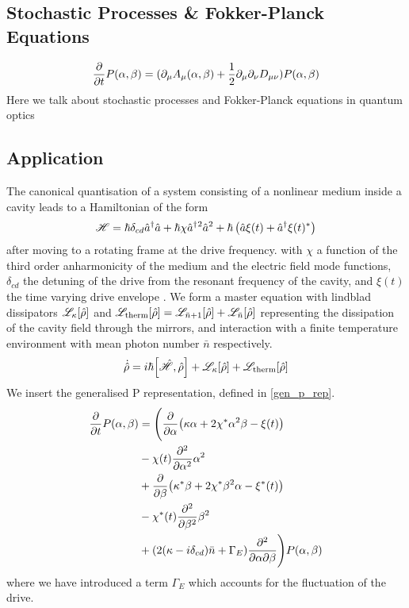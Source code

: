 \subsection{Stochastic Processes \& Fokker-Planck Equations}
\begin{equation}
  \pdv{t}P(\alpha, \beta) = (\partial_\mu A_\mu (\alpha, \beta) + \frac{1}{2} \partial_\mu \partial_\nu D_{\mu\nu}) P(\alpha, \beta) 
  \label{fokker_planck}
\end{equation}
Here we talk about stochastic processes and Fokker-Planck equations in quantum optics 
 \cite{Carmichael1992} 
 \cite{Carmichael2008} 
 \cite{Breuer2002} 
\subsection{Application}
The canonical quantisation of a system consisting of a nonlinear medium inside a cavity leads to a Hamiltonian of the form 
\begin{equation}
  \mathscr{H} = \hbar \delta_{cd} {\hat{a}^\dagger} \hat{a} + \hbar \chi {\hat{a}^\dagger}{}^ 2 \hat{a}{}^ 2 + \hbar \left( \hat{a} \xi(t) + {\hat{a}^\dagger} \xi(t)^* \right) 
\end{equation}
after moving to a rotating frame at the drive frequency.
with $\chi$ a function of the third order anharmonicity of the medium and the electric field mode functions, $\delta_{cd}$ the detuning of the drive from the resonant frequency of the cavity, and $\xi(t)$ the time varying drive envelope \cite{Drummond1979}.
We form a master equation with lindblad dissipators $\mathscr{L}_{\kappa}[\hat{\rho}]$ and $\mathscr{L}_{\text{therm}}[\hat{\rho}] = \mathscr{L}_{\bar{n}+1}[\hat{\rho}] +  \mathscr{L}_{\bar{n}}[\hat{\rho}]$ representing the dissipation of the cavity field through the mirrors, and interaction with a finite temperature environment with mean photon number $\bar{n}$ respectively.
\begin{equation}
  \dot{\dens} = i\hbar\comm{\ham}{\dens} + \mathscr{L}_{\kappa}[\dens] + \mathscr{L}_{\text{therm}}[\dens]
\end{equation}
We insert the generalised P representation, defined in \cref{gen_p_rep}.
\begin{align}
  \pdv{t} P(\alpha, \beta)  &= \Bigg(\pdv{\alpha} (\kappa \alpha + 2 \chi^* \alpha^2 \beta - \xi(t) )\\ 
                            &- \chi(t) \pdv[2]{\alpha} \alpha^2\\
                            &+ \pdv{\beta} (\kappa^* \beta + 2\chi^* \beta^2 \alpha - \xi^*(t))\\
                            &- \chi^*(t) \pdv[2]{\beta} \beta^2\\
                            &+ (2(\kappa - i\delta_{cd})\bar{n} + \Gamma_E ) \pdv{}{\alpha}{\beta}\Bigg) P(\alpha, \beta)
\end{align}
where we have introduced a term $\Gamma_E$ which accounts for the fluctuation of the drive.

